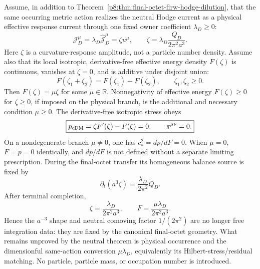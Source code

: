 \documentclass[12pt,a4paper]{article}
\begin{document}
\begin{theorem}
\label{p8:thm:k48-conditional-exact-dust}
Assume, in addition to
Theorem~\ref{p8:thm:final-octet-flrw-hodge-dilution}, that the same occurring
metric action realizes the neutral Hodge current as a physical effective
response current through one fixed owner coefficient \(\lambda_D\geq0\):
\begin{equation}
 \label{p8:eq:physical-current-owner-map}
 \mathcal J_D^\mu
 =\lambda_D\widehat{\mathcal J}_D^\mu
 =\zeta u^\mu,
 \qquad
 \boxed{\zeta
 =\lambda_D\frac{Q_D}{2\pi^2a^3}}.
\end{equation}
Here \(\zeta\) is a curvature-response amplitude, not a particle number
density.  Assume also that its local isotropic, derivative-free effective
energy density \(F(\zeta)\) is continuous, vanishes at \(\zeta=0\), and is
additive under disjoint union:
\begin{equation}
 F(\zeta_1+\zeta_2)=F(\zeta_1)+F(\zeta_2),
 \qquad \zeta_1,\zeta_2\geq0.
\end{equation}
Then \(F(\zeta)=\mu\zeta\) for some \(\mu\in\mathbb R\).
Nonnegativity of effective energy \(F(\zeta)\geq0\) for \(\zeta\geq0\), if imposed
on the physical branch, is the additional and necessary condition \(\mu\geq0\).
The derivative-free isotropic stress obeys
\begin{equation}
 \boxed{
 p_{\rm cDM}=\zeta F'(\zeta)-F(\zeta)=0,
 \qquad
 \pi^{\mu\nu}=0.}
\end{equation}
On a nondegenerate branch \(\mu\ne0\), one has \(c_s^2=dp/dF=0\).
When \(\mu=0\), \(F=p=0\) identically, and \(dp/dF\) is not defined
without a separate limiting prescription.
During the final-octet transfer its homogeneous balance source is fixed by
\begin{equation}
 \label{p8:eq:physical-current-transfer-source}
 \partial_t(a^3\zeta)=\frac{\lambda_D}{2\pi^2}\dot Q_D.
\end{equation}
After terminal completion,
\begin{equation}
 \label{p8:eq:physical-current-terminal-dust}
 \boxed{
 \zeta=\frac{\lambda_D}{2\pi^2a^3},
 \qquad
 F=\frac{\mu\lambda_D}{2\pi^2a^3}.}
\end{equation}
Hence the \(a^{-3}\) shape and neutral comoving factor \(1/(2\pi^2)\) are no
longer free integration data: they are fixed by the canonical final-octet
geometry.  What remains unproved by the neutral theorem is physical occurrence
and the dimensionful same-action conversion \(\mu\lambda_D\), equivalently its
Hilbert-stress/residual matching.  No particle, particle mass, or occupation
number is introduced.
\end{theorem}
\end{document}
